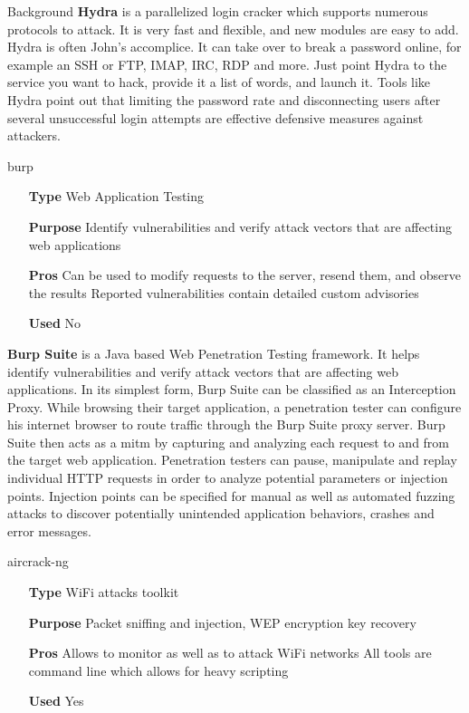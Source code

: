 \begin{chaptercover}{Background}
\textbf{Hydra} \cite{hydra} is a parallelized login cracker which supports numerous protocols to attack. It is very fast and flexible, and new modules are easy to add. Hydra is often John's accomplice. It can take over to break a password online, for example an SSH or FTP, IMAP, IRC, RDP and more. Just point Hydra to the service you want to hack, provide it a list of words, and launch it. Tools like Hydra point out that limiting the password rate and disconnecting users after several unsuccessful login attempts are effective defensive measures against attackers.

\begin{solutiondata}{burp}
\begin{itemize}[labelsep=1cm]
  \item [\textbf{Type}] Web Application Testing
  \item [\textbf{Purpose}] Identify vulnerabilities and verify attack vectors that are affecting web applications
  \item [\textbf{Pros}] Can be used to modify requests to the server, resend them, and observe the results \newline Reported vulnerabilities contain detailed custom advisories
  \item [\textbf{Used}] No
\end{itemize}
\end{solutiondata}

\textbf{Burp Suite} \cite{burp} is a Java based Web Penetration Testing framework. It helps identify vulnerabilities and verify attack vectors that are affecting web applications. In its simplest form, Burp Suite can be classified as an Interception Proxy. While browsing their target application, a penetration tester can configure his internet browser to route traffic through the Burp Suite proxy server. Burp Suite then acts as a \acrfull{mitm} by capturing and analyzing each request to and from the target web application. Penetration testers can pause, manipulate and replay individual HTTP requests in order to analyze potential parameters or injection points. Injection points can be specified for manual as well as automated fuzzing attacks to discover potentially unintended application behaviors, crashes and error messages.

\begin{solutiondata}{aircrack-ng}
\begin{itemize}[labelsep=1cm]
  \item [\textbf{Type}] WiFi attacks toolkit
  \item [\textbf{Purpose}] Packet sniffing and injection, WEP encryption key recovery
  \item [\textbf{Pros}] Allows to monitor as well as to attack WiFi networks \newline All tools are command line which allows for heavy scripting
  \item [\textbf{Used}] Yes
\end{itemize}
\end{solutiondata}


\end{chaptercover}
